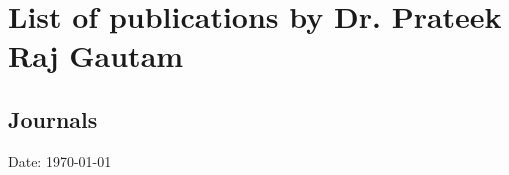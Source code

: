 \documentclass[10pt,a4paper]{article}
\begin{document}
\section{List of publications by Dr. Prateek Raj Gautam}
\subsection{Journals}

\vfill
\hfill Date: \today
\nocite{*}
\end{document}

